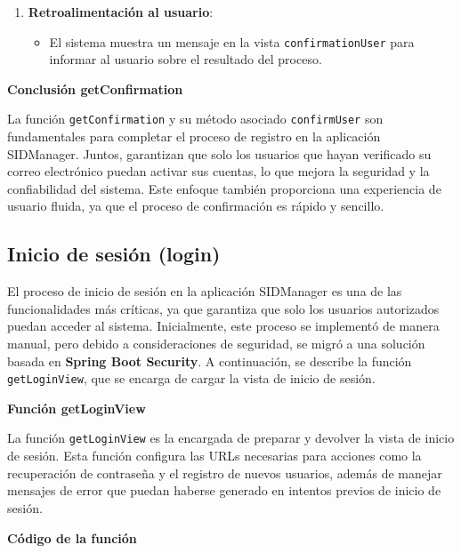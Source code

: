 \documentclass[draft]{scrbook}
\begin{document}
\begin{enumerate}
\begin{enumerate}
    \item \textbf{Retroalimentación al usuario}:
    \begin{itemize}
        \item El sistema muestra un mensaje en la vista \texttt{confirmationUser} para informar al usuario sobre el resultado del proceso.
    \end{itemize}
\end{enumerate}

\textbf{Conclusión getConfirmation}

La función \texttt{getConfirmation} y su método asociado \texttt{confirmUser} son fundamentales para completar el proceso de registro en la aplicación SIDManager. Juntos, garantizan que solo los usuarios que hayan verificado su correo electrónico puedan activar sus cuentas, lo que mejora la seguridad y la confiabilidad del sistema. Este enfoque también proporciona una experiencia de usuario fluida, ya que el proceso de confirmación es rápido y sencillo.

\end{enumerate}
    

\subsection{Inicio de sesión (login)}

El proceso de inicio de sesión en la aplicación SIDManager es una de las funcionalidades más críticas, ya que garantiza que solo los usuarios autorizados puedan acceder al sistema. Inicialmente, este proceso se implementó de manera manual, pero debido a consideraciones de seguridad, se migró a una solución basada en \textbf{Spring Boot Security}. A continuación, se describe la función \texttt{getLoginView}, que se encarga de cargar la vista de inicio de sesión.

\textbf{Función getLoginView}

La función \texttt{getLoginView} es la encargada de preparar y devolver la vista de inicio de sesión. Esta función configura las URLs necesarias para acciones como la recuperación de contraseña y el registro de nuevos usuarios, además de manejar mensajes de error que puedan haberse generado en intentos previos de inicio de sesión.

\textbf{Código de la función}
\end{document}
